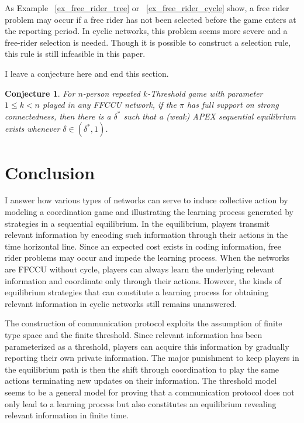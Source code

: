 \documentclass[12pt,letterpaper]{article}
\newtheorem*{main result}{Main Result}
\newtheorem{conjecture}{Conjecture}[section]
\theoremstyle{definition}
\theoremstyle{remark}
\theoremstyle{claim}
\begin{document}
As Example ~\ref{ex_free_rider_tree} or ~\ref{ex_free_rider_cycle} show, a free rider problem may occur if a free rider has not been selected before the game enters at the reporting period. In cyclic networks, this problem seems more severe and a free-rider selection is needed. Though it is possible to construct a selection rule, this rule is still infeasible in this paper. 

I leave a conjecture here and end this section.

\begin{conjecture}
For $n$-person repeated $k$-Threshold game with parameter $1\leq k < n$ played in any FFCCU network,
if the $\pi$ has full support on strong connectedness, then there is a $\delta^{*}$ such that a (weak) APEX sequential equilibrium exists whenever $\delta\in(\delta^{*},1)$.
\end{conjecture}



\section{Conclusion}
\label{sec:con}

I answer how various types of networks can serve to induce collective action by modeling a coordination game and illustrating the learning process generated by strategies in a sequential equilibrium. In the equilibrium, players transmit relevant information by encoding such information through their actions in the time horizontal line. Since an expected cost exists in coding information, free rider problems may occur and impede the learning process. When the networks are FFCCU without cycle, players can always learn the underlying relevant information and coordinate only through their actions. However, the kinds of equilibrium strategies that can constitute a learning process for obtaining relevant information in cyclic networks still remains unanswered.

The construction of communication protocol exploits the assumption of finite type space and the finite threshold. Since relevant information has been parameterized as a threshold, players can acquire this information by gradually reporting their own private information. The major punishment to keep players in the equilibrium path is then the shift through coordination to play the same actions terminating new updates on their information. The threshold model seems to be a general model for proving that a communication protocol  does not only lead to a learning process but also constitutes an equilibrium revealing relevant information in finite time.
\end{document}
